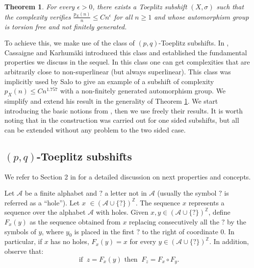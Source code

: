 \documentclass{daj}
\theoremstyle{plain}
\newtheorem{theorem}{Theorem}[section]
\theoremstyle{definition}
\begin{document}
\begin{theorem} \label{Thm:LowComplexityToeplitz}
	For every $\epsilon>0$, there exists a Toeplitz subshift $(X,\sigma)$ such that the complexity verifies $\frac{p_X(n)}{n}\leq C n^{\epsilon}$ for all $n \geq 1$ and whose automorphism group is torsion free and not  finitely generated. 
\end{theorem} 

To achieve this, we make use of the class of $(p,q)$-Toeplitz subshifts. In \cite{CK}, Cassaigne and Karhum\"aki introduced this class and established the fundamental properties we discuss in the sequel. In this class one can get complexities that are arbitrarily close to non-superlinear (but always superlinear). This class was implicitly used by Salo \cite{Salo} to give an example of a subshift of complexity $p_X(n)\leq Cn^{1.757}$ with a non-finitely generated automorphism group. We simplify and extend his result in the generality of Theorem \ref{Thm:LowComplexityToeplitz}. We start introducing the basic notions from \cite{CK}, then we use freely their results. It is worth noting that in \cite{CK} the construction was carried out for one sided subshifts, but all can be extended without any problem to the two sided case. 


\subsection{$(p,q)$-Toeplitz subshifts}
We refer to Section 2 in \cite{CK} for a detailed discussion on next properties and concepts. 

Let $\mathcal{A}$ be a finite alphabet and $?$ a letter not in $\mathcal{A}$ (usually the symbol $?$ is referred as a ``hole'').
Let $x$ $\in (\mathcal{A}\cup \{ \text{?} \})^{\mathbb{Z}}$. The sequence $x$ represents a sequence over the alphabet $\mathcal{A}$ with holes. Given $x, y \in (\mathcal{A}\cup \{\text{?}\})^{\mathbb{Z}}$, define 
$F_x(y)$ as the sequence obtained from $x$ replacing consecutively all the $?$ by the symbols of $y$, where $y_0$ is placed in the first $?$ to the right of coordinate $0$. In particular, if 
$x$ has no holes, $F_{x}(y)=x$ for every $y \in (\mathcal{A}\cup \{\text{?}\})^{\mathbb{Z}}$. 
In addition, observe that:
\begin{equation}\label{eq:magicformula}
\text{ if } \ z=F_{x}(y) \text{ then } \ F_{z}=F_{x}\circ F_{y}.
\end{equation}
\end{document}
